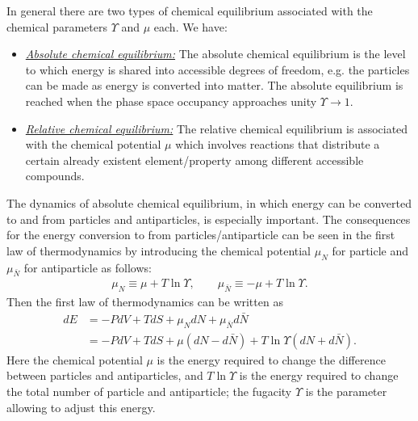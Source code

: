 In general there are two types of chemical equilibrium associated with the chemical parameters $\Upsilon$ and $\mu$ each. We have:
\begin{itemize}
\item \underline{\it Absolute chemical equilibrium:\/} 
The absolute chemical equilibrium is the level to which energy is shared into accessible degrees of freedom, e.g. the particles can be made as energy is converted into matter.
The absolute equilibrium is reached when the phase space occupancy approaches unity $\Upsilon\to1$. 
 \item  \underline{\it Relative chemical equilibrium:\/}
 The relative chemical equilibrium is associated with the chemical potential $\mu$ which involves reactions that distribute a certain already existent element/property among different accessible compounds. 
 \end{itemize}
The dynamics of absolute chemical equilibrium, in which energy can be converted to and from particles and antiparticles, is especially important. The consequences for the energy conversion to from particles/antiparticle can be seen in the first law of thermodynamics by introducing the  chemical potential $\mu_N$ for particle and $\mu_{\bar{N}}$ for antiparticle as follows:
\begin{align}
\mu_N\equiv\mu+T\ln\Upsilon,\qquad{\mu_{\bar{N}}}\equiv{-\mu}+T\ln\Upsilon.
\end{align}
Then the first law of thermodynamics can be written as
\begin{align}
dE&=-PdV+TdS+{\mu_N}dN+{\mu_{\bar{N}}}d{\bar{N}}
\\&=-PdV+TdS+{\mu}(dN-d{\bar{N}})+T\ln{\Upsilon}(dN+d{\bar{N}}).
\end{align}
Here the chemical potential $\mu$ is the energy required to change the difference between particles and antiparticles, and $T\ln\Upsilon$ is the energy required to change the total number of particle and antiparticle;  the fugacity $\Upsilon$ is the parameter allowing to adjust this energy.

